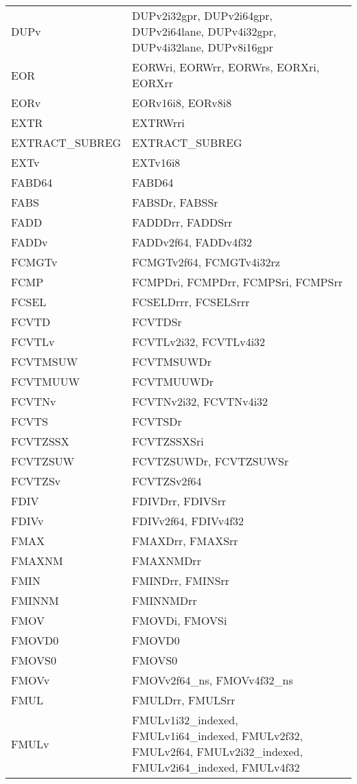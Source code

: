 \begin{xltabular}{\textwidth}{lX}
    DUPv & DUPv2i32gpr, DUPv2i64gpr, DUPv2i64lane, DUPv4i32gpr, DUPv4i32lane, DUPv8i16gpr \\
    EOR & EORWri, EORWrr, EORWrs, EORXri, EORXrr \\
    EORv & EORv16i8, EORv8i8 \\
    EXTR & EXTRWrri \\
    EXTRACT\_SUBREG & EXTRACT\_SUBREG \\
    EXTv & EXTv16i8 \\
    FABD64 & FABD64 \\
    FABS & FABSDr, FABSSr \\
    FADD & FADDDrr, FADDSrr \\
    FADDv & FADDv2f64, FADDv4f32 \\
    FCMGTv & FCMGTv2f64, FCMGTv4i32rz \\
    FCMP & FCMPDri, FCMPDrr, FCMPSri, FCMPSrr \\
    FCSEL & FCSELDrrr, FCSELSrrr \\
    FCVTD & FCVTDSr \\
    FCVTLv & FCVTLv2i32, FCVTLv4i32 \\
    FCVTMSUW & FCVTMSUWDr \\
    FCVTMUUW & FCVTMUUWDr \\
    FCVTNv & FCVTNv2i32, FCVTNv4i32 \\
    FCVTS & FCVTSDr \\
    FCVTZSSX & FCVTZSSXSri \\
    FCVTZSUW & FCVTZSUWDr, FCVTZSUWSr \\
    FCVTZSv & FCVTZSv2f64 \\
    FDIV & FDIVDrr, FDIVSrr \\
    FDIVv & FDIVv2f64, FDIVv4f32 \\
    FMAX & FMAXDrr, FMAXSrr \\
    FMAXNM & FMAXNMDrr \\
    FMIN & FMINDrr, FMINSrr \\
    FMINNM & FMINNMDrr \\
    FMOV & FMOVDi, FMOVSi \\
    FMOVD0 & FMOVD0 \\
    FMOVS0 & FMOVS0 \\
    FMOVv & FMOVv2f64\_ns, FMOVv4f32\_ns \\
    FMUL & FMULDrr, FMULSrr \\
    FMULv & FMULv1i32\_indexed, FMULv1i64\_indexed, FMULv2f32, FMULv2f64, FMULv2i32\_indexed, FMULv2i64\_indexed, FMULv4f32 \\

\end{xltabular}
